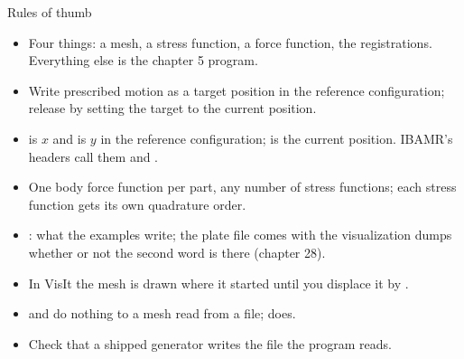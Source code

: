 \documentclass[aspectratio=169,11pt]{beamer}
\begin{document}
\begin{frame}{Rules of thumb}
\label{fr:thumb}
\small
\begin{itemize}
  \item Four things: a mesh, a stress function, a force function, the registrations. Everything else is the chapter 5 program.
  \item Write prescribed motion as a target position in the reference configuration; release by setting the target to the current position.
  \item {} is $x$ and  is $y$ in the reference configuration;  is the current position. IBAMR's headers call them  and .
  \item One body force function per part, any number of stress functions; each stress function gets its own quadrature order.
  \item {}: what the examples write; the plate file comes with the visualization dumps whether or not the second word is there (chapter 28).
  \item In VisIt the mesh is drawn where it started until you displace it by .
  \item {} and  do nothing to a mesh read from a file;  does.
  \item Check that a shipped generator writes the file the program reads.
\end{itemize}
\end{frame}
\end{document}
